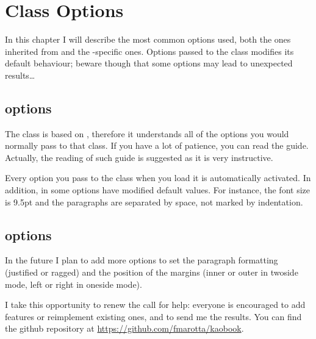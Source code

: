 \setchapterpreamble[u]{\margintoc}
\chapter{Class Options}

In this chapter I will describe the most common options used, both the 
ones inherited from  and the -specific ones. 
Options passed to the class modifies its default behaviour; beware 
though that some options may lead to unexpected results\ldots

\section{ options}

The  class is based on , therefore it 
understands all of the options you would normally pass to that class. If 
you have a lot of patience, you can read the \KOMAScript\xspace 
guide. Actually, the reading 
of such guide is suggested as it is very instructive.

Every \KOMAScript\xspace option you pass to the class when you load it 
is automatically activated. In addition, in  some options 
have modified default values. For instance, the font size is 9.5pt and 
the paragraphs are separated by space, not marked by indentation.

\section{ options}

In the future I plan to add more options to set the paragraph formatting 
(justified or ragged) and the position of the margins (inner or outer in 
twoside mode, left or right in oneside mode).

I take this opportunity to renew the call for help: everyone is 
encouraged to add features or reimplement existing ones, and to send me 
the results. You can find the github repository at 
\url{https://github.com/fmarotta/kaobook}.

